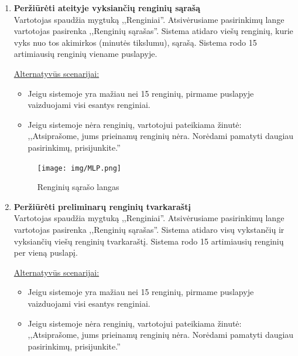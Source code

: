 \documentclass{VUMIFPSkursinis}
\begin{document}
\begin{enumerate} [label = \textbf{U\arabic*.}]
				\begin{figure}[H]
						\centering
						\texttt{[image: img/MLP.png]}
						\caption{Prisijungimo langas}
						\label{fig:prisijungimo-langas}
					\end{figure}
				
			\item \textbf{Peržiūrėti ateityje vyksiančių renginių sąrašą} \\
				Vartotojas spaudžia mygtuką ,,Renginiai''. 
				Atsivėrusiame pasirinkimų lange vartotojas pasirenka ,,Renginių sąrašas''.
				Sistema atidaro viešų renginių, kurie vyks nuo tos akimirkos (minutės tikslumu), sąrašą. 
				Sistema rodo 15 artimiausių renginių viename puslapyje.
				
				\underline{Alternatyvūs scenarijai:}
				\begin{itemize}
					\item Jeigu sistemoje yra mažiau nei 15 renginių, pirmame puslapyje vaizduojami visi esantys renginiai. 
					\item Jeigu sistemoje nėra renginių, vartotojui pateikiama žinutė:
					,,Atsiprašome, jums prieinamų renginių nėra. Norėdami pamatyti daugiau pasirinkimų, prisijunkite.''
				\end{itemize}

				\begin{figure}[H]
					\centering
					\texttt{[image: img/MLP.png]}
					\caption{Renginių sąrašo langas}
					\label{fig:uzd_perziureti-vyksianciu-renginiu-sarasa}
				\end{figure}
				
			\item \textbf{Peržiūrėti preliminarų renginių tvarkaraštį} \\
				Vartotojas spaudžia mygtuką ,,Renginiai''. 
				Atsivėrusiame pasirinkimų lange vartotojas pasirenka ,,Renginių sąrašas''.
				Sistema atidaro visų vykstančių ir vyksiančių viešų renginių tvarkaraštį. 
				Sistema rodo 15 artimiausių renginių per vieną puslapį.
				
				\underline{Alternatyvūs scenarijai:}
				\begin{itemize}
					\item Jeigu sistemoje yra mažiau nei 15 renginių, pirmame puslapyje vaizduojami visi esantys renginiai. 
					\item Jeigu sistemoje nėra renginių, vartotojui pateikiama žinutė:
					,,Atsiprašome, jums prieinamų renginių nėra. Norėdami pamatyti daugiau pasirinkimų, prisijunkite.''
				\end{itemize}


\end{enumerate}
\end{document}
